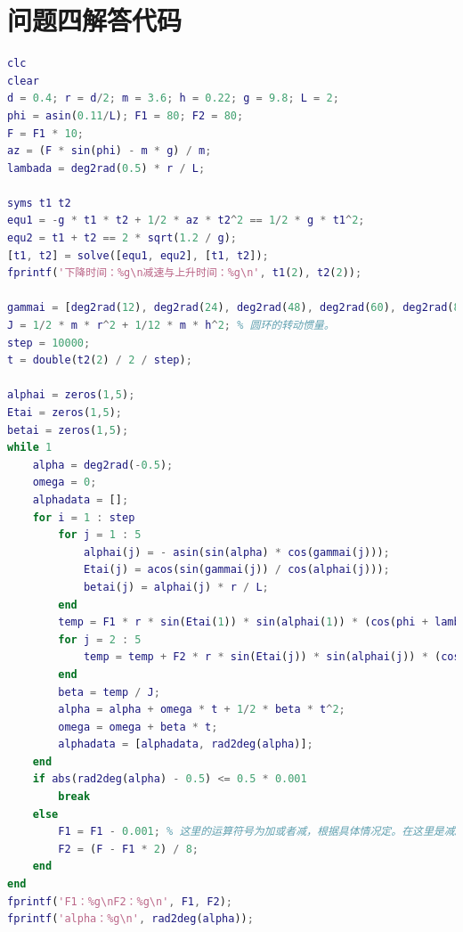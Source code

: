 \documentclass{cumcm}
\begin{document}
\section{问题四解答代码}
\begin{lstlisting}[language=matlab]
clc
clear
d = 0.4; r = d/2; m = 3.6; h = 0.22; g = 9.8; L = 2;
phi = asin(0.11/L); F1 = 80; F2 = 80;
F = F1 * 10;
az = (F * sin(phi) - m * g) / m;
lambada = deg2rad(0.5) * r / L;

syms t1 t2
equ1 = -g * t1 * t2 + 1/2 * az * t2^2 == 1/2 * g * t1^2;
equ2 = t1 + t2 == 2 * sqrt(1.2 / g);
[t1, t2] = solve([equ1, equ2], [t1, t2]);
fprintf('下降时间：%g\n减速与上升时间：%g\n', t1(2), t2(2));

gammai = [deg2rad(12), deg2rad(24), deg2rad(48), deg2rad(60), deg2rad(84)];
J = 1/2 * m * r^2 + 1/12 * m * h^2; % 圆环的转动惯量。
step = 10000;
t = double(t2(2) / 2 / step);

alphai = zeros(1,5);
Etai = zeros(1,5);
betai = zeros(1,5);
while 1
    alpha = deg2rad(-0.5);
    omega = 0;
    alphadata = [];
    for i = 1 : step
        for j = 1 : 5
            alphai(j) = - asin(sin(alpha) * cos(gammai(j)));
            Etai(j) = acos(sin(gammai(j)) / cos(alphai(j)));
            betai(j) = alphai(j) * r / L;
        end
        temp = F1 * r * sin(Etai(1)) * sin(alphai(1)) * (cos(phi + lambada - betai(1)) + cos(phi - lambada + betai(1)));
        for j = 2 : 5
            temp = temp + F2 * r * sin(Etai(j)) * sin(alphai(j)) * (cos(phi + lambada - betai(j)) + cos(phi - lambada + betai(j)));
        end
        beta = temp / J;
        alpha = alpha + omega * t + 1/2 * beta * t^2;
        omega = omega + beta * t;
        alphadata = [alphadata, rad2deg(alpha)];
    end
    if abs(rad2deg(alpha) - 0.5) <= 0.5 * 0.001
        break
    else
        F1 = F1 - 0.001; % 这里的运算符号为加或者减，根据具体情况定。在这里是减。
        F2 = (F - F1 * 2) / 8;
    end
end
fprintf('F1：%g\nF2：%g\n', F1, F2);
fprintf('alpha：%g\n', rad2deg(alpha));
\end{lstlisting}
\end{document}
